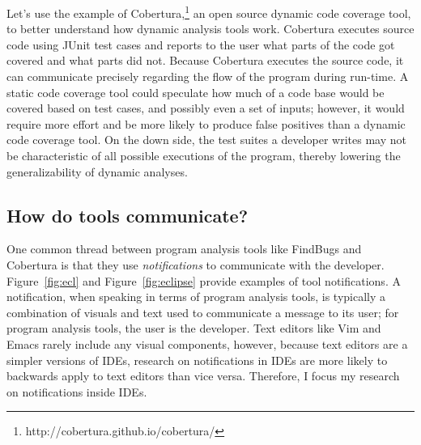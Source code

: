 \documentclass{llncs}
\begin{document}
Let's use the example of Cobertura,\footnote{http://cobertura.github.io/cobertura/} an open source dynamic code coverage tool, to better understand how dynamic analysis tools work. Cobertura executes source code using JUnit test cases and reports to the user what parts of the code got covered and what parts did not. Because Cobertura executes the source code, it can communicate precisely regarding the flow of the program during run-time. A static code coverage tool could speculate how much of a code base would be covered based on test cases, and possibly even a set of inputs; however, it would require more effort and be more likely to produce false positives than a dynamic code coverage tool. On the down side, the test suites a developer writes may not be characteristic of all possible executions of the program, thereby lowering the generalizability of dynamic analyses.

\subsection{How do tools communicate?}\label{subsec:comm}

One common thread between program analysis tools like FindBugs and Cobertura is that they use \emph{notifications} to communicate with the developer. Figure~\ref{fig:ecl} and Figure~\ref{fig:eclipse} provide examples of tool notifications. 
A notification, when speaking in terms of program analysis tools, is typically a combination of visuals and text used to communicate a message to its user; for program analysis tools, the user is the developer.
Text editors like Vim and Emacs rarely include any visual components, however, because text editors are a simpler versions of IDEs, research on notifications in IDEs are more likely to backwards apply to text editors than vice versa. 
Therefore, I focus my research on notifications inside IDEs.
\end{document}
